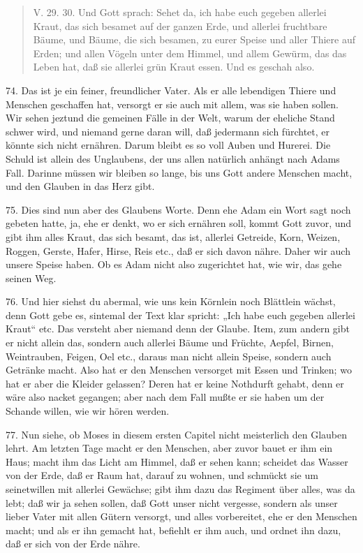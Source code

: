 \begin{quote}
V. 29. 30. Und Gott sprach: Sehet da, ich habe euch gegeben allerlei Kraut, das sich besamet auf der ganzen Erde, und allerlei fruchtbare Bäume, und Bäume, die sich besamen, zu eurer Speise und aller Thiere auf Erden; und allen Vögeln unter dem Himmel, und allem Gewürm, das das Leben hat, daß sie allerlei grün Kraut essen. Und es geschah also.
\end{quote}

74. Das ist je ein feiner, freundlicher Vater. Als er alle lebendigen Thiere und Menschen geschaffen hat, versorgt er sie auch mit allem, was sie haben sollen. Wir sehen jeztund die gemeinen Fälle in der Welt, warum der eheliche Stand schwer wird, und niemand gerne daran will, daß jedermann sich fürchtet, er könnte sich nicht ernähren. Darum bleibt es so voll Auben und Hurerei. Die Schuld ist allein des Unglaubens, der uns allen natürlich anhängt nach Adams Fall. Darinne müssen wir bleiben so lange, bis uns Gott andere Menschen macht, und den Glauben in das Herz gibt.

75. Dies sind nun aber des Glaubens Worte. Denn ehe Adam ein Wort sagt noch gebeten hatte, ja, ehe er denkt, wo er sich ernähren soll, kommt Gott zuvor, und gibt ihm alles Kraut, das sich besamt, das ist, allerlei Getreide, Korn, Weizen, Roggen, Gerste, Hafer, Hirse, Reis etc., daß er sich davon nähre. Daher wir auch unsere Speise haben. Ob es Adam nicht also zugerichtet hat, wie wir, das gehe seinen Weg.

76. Und hier siehst du abermal, wie uns kein Körnlein noch Blättlein wächst, denn Gott gebe es, sintemal der Text klar spricht: „Ich habe euch gegeben allerlei Kraut“ etc. Das versteht aber niemand denn der Glaube. Item, zum andern gibt er nicht allein das, sondern auch allerlei Bäume und Früchte, Aepfel, Birnen, Weintrauben, Feigen, Oel etc., daraus man nicht allein Speise, sondern auch Getränke macht. Also hat er den Menschen versorget mit Essen und Trinken; wo hat er aber die Kleider gelassen? Deren hat er keine Nothdurft gehabt, denn er wäre also nacket gegangen; aber nach dem Fall mußte er sie haben um der Schande willen, wie wir hören werden.

77. Nun siehe, ob Moses in diesem ersten Capitel nicht meisterlich den Glauben lehrt. Am letzten Tage macht er den Menschen, aber zuvor bauet er ihm ein Haus; macht ihm das Licht am Himmel, daß er sehen kann; scheidet das Wasser von der Erde, daß er Raum hat, darauf zu wohnen, und schmückt sie um seinetwillen mit allerlei Gewächse; gibt ihm dazu das Regiment über alles, was da lebt; daß wir ja sehen sollen, daß Gott unser nicht vergesse, sondern als unser lieber Vater mit allen Gütern versorgt, und alles vorbereitet, ehe er den Menschen macht; und als er ihn gemacht hat, befiehlt er ihm auch, und ordnet ihn dazu, daß er sich von der Erde nähre.

